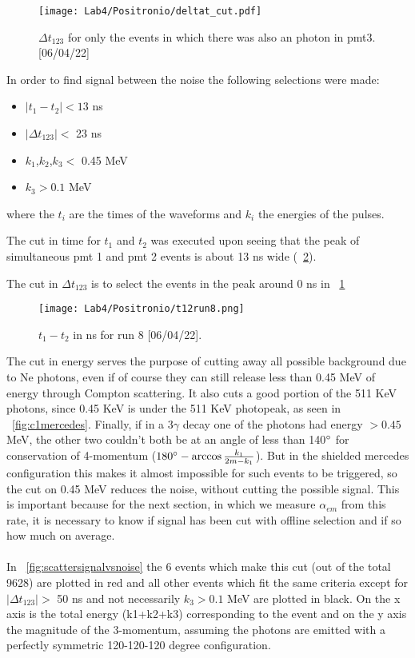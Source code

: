 \documentclass[10pt,a4paper,twocolumn]{article}
\begin{document}
\begin{figure}[h!]
\centering
\texttt{[image: Lab4/Positronio/deltat\_cut.pdf]} 
\caption{$\Delta t_{123}$ for only the events in which there was also an photon in pmt3. [06/04/22]}
\label{fig:t123distrib_cut}
\end{figure}

\noindent In order to find signal between the noise the following selections were made:

\begin{itemize}
    \item $|t_1-t_2|<13$ ns
    \item $|\Delta t_{123}|<$ 23 ns
    \item $k_1$,$k_2$,$k_3<$ 0.45 MeV
    \item $k_3>0.1$ MeV
\end{itemize}

\noindent where the $t_i$ are the times of the waveforms and $k_i$ the energies of the pulses. 

The cut in time for $t_1$ and $t_2$ was executed upon seeing that the peak of simultaneous pmt 1 and pmt 2 events is about 13 ns wide (\figurename~\ref{fig:t12run8}).

The cut in $\Delta t_{123}$ is to select the events in the peak around 0 ns in \figurename~\ref{fig:t123distrib_cut}

\begin{figure}[h!]
\centering
\texttt{[image: Lab4/Positronio/t12run8.png]} 
\caption{$t_1-t_2$ in ns for run 8 [06/04/22].}
\label{fig:t12run8}
\end{figure}

The cut in energy serves the purpose of cutting away all possible background due to Ne photons, even if of course they can still release less than 0.45 MeV of energy through Compton scattering. It also cuts a good portion of the 511 KeV photons, since 0.45 KeV is under the 511 KeV photopeak, as seen in \figurename~\ref{fig:c1mercedes}. Finally, if in a $3\gamma$ decay one of the photons had energy $>0.45$ MeV, the other two couldn't both be at an angle of less than 140$\degree$ for conservation of 4-momentum ($180\degree - \arccos{\frac{k_1}{2m-k_1}}$). But in the shielded mercedes configuration this makes it almost impossible for such events to be triggered, so the cut on 0.45 MeV reduces the noise, without cutting the possible signal. This is important because for the next section, in which we measure $\alpha_{em}$ from this rate, it is necessary to know if signal has been cut with offline selection and if so how much on average.
\\
\\
In \figurename~\ref{fig:scattersignalvsnoise} the 6 events which make this cut (out of the total 9628) are plotted in red and all other events which fit the same criteria except for $|\Delta t_{123}|>$ 50 ns and not necessarily $k_3>0.1$ MeV are plotted in black. On the x axis is the total energy (k1+k2+k3) corresponding to the event and on the y axis the magnitude of the 3-momentum, assuming the photons are emitted with a perfectly symmetric 120-120-120 degree configuration. 
\end{document}

